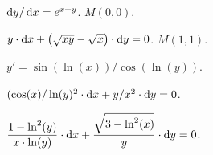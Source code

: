 \begin{problem}
	$\mathop{}\!\mathrm{d} y / \mathop{}\!\mathrm{d} x = e^{x + y}$.  $M(0,0)$.
\end{problem}

\begin{problem}
	$y \cdot \mathop{}\!\mathrm{d} x + \left( \sqrt{x y} - \sqrt{x} \right) \cdot \mathop{}\!\mathrm{d} y = 0$.  $M(1,1)$.
\end{problem}

\begin{problem}
	$y' = \sin (\ln (x)) / \cos (\ln (y))$.
\end{problem}

\begin{problem}
	$(\cos (x) / \ln (y)^2 \cdot \mathop{}\!\mathrm{d} x + y / x^2 \cdot \mathop{}\!\mathrm{d} y = 0$.
\end{problem}

\begin{problem}
	$\dfrac{1 - \ln^2 (y)}{x \cdot \ln (y)} \cdot \mathop{}\!\mathrm{d} x + \dfrac{\sqrt{3 - \ln^2 (x)}}{y} \cdot \mathop{}\!\mathrm{d} y = 0$.
\end{problem}
